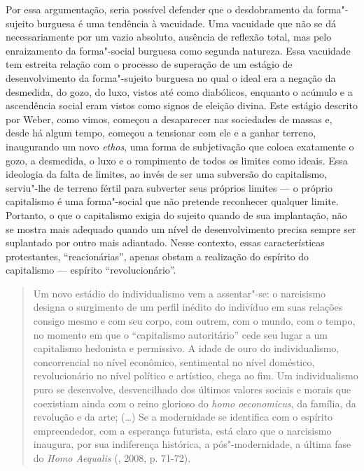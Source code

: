 Por essa argumentação, seria possível defender que o desdobramento da
forma"-sujeito burguesa é uma tendência à vacuidade. Uma vacuidade que
não se dá necessariamente por um vazio absoluto, ausência de reflexão
total, mas pelo enraizamento da forma"-social burguesa como segunda
natureza. Essa vacuidade tem estreita relação com o processo de
superação de um estágio de desenvolvimento da forma"-sujeito burguesa no
qual o ideal era a negação da desmedida, do gozo, do luxo, vistos até
como diabólicos, enquanto o acúmulo e a ascendência social eram vistos
como signos de eleição divina. Este estágio descrito por Weber,
como vimos, começou a desaparecer nas sociedades de
massas e, desde há algum tempo, começou a tensionar com ele e a ganhar
terreno, inaugurando um novo \emph{ethos}, uma forma de subjetivação que
coloca exatamente o gozo, a desmedida, o luxo e o rompimento de todos os
limites como ideais. Essa ideologia da falta de limites, ao invés de ser
uma subversão do capitalismo, serviu"-lhe de terreno fértil para
subverter seus próprios limites --- o próprio capitalismo é uma
forma"-social que não pretende reconhecer qualquer limite.
Portanto, o que o capitalismo exigia do sujeito quando de sua
implantação, não se mostra mais adequado quando um nível de
desenvolvimento precisa sempre ser suplantado por outro mais adiantado.
Nesse contexto, essas características protestantes, ``reacionárias'',
apenas obstam a realização do espírito do capitalismo --- espírito
``revolucionário''.

\begin{quote}
Um novo estádio do individualismo vem a assentar"-se: o narcisismo
designa o surgimento de um perfil inédito do indivíduo em suas relações
consigo mesmo e com seu corpo, com outrem, com o mundo, com o tempo, no
momento em que o ``capitalismo autoritário'' cede seu lugar a um
capitalismo hedonista e permissivo. A idade de ouro do individualismo,
concorrencial no nível econômico, sentimental no nível doméstico,
revolucionário no nível político e artístico, chega ao fim. Um
individualismo puro se desenvolve, desvencilhado dos últimos valores
sociais e morais que coexistiam ainda com o reino glorioso do \emph{homo
oeconomicus}, da família, da revolução e da arte; (\ldots{}) Se a modernidade
se identifica com o espírito empreendedor, com a esperança futurista,
está claro que o narcisismo inaugura, por sua indiferença histórica, a
pós"-modernidade, a última fase do \emph{Homo Aequalis}
(, 2008, p. 71-72).
\end{quote}

